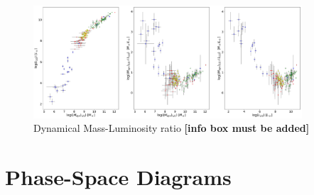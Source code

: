 \documentclass{aa}
\begin{document}
\begin{figure}[!htb]
   \centering
   \includegraphics[angle=90, width=10cm]{../2_pipeline/3_MassDyn_Luminosity+Liter/DyM-L+Liter.pdf}   		
  	 \caption{Dynamical Mass-Luminosity ratio \textbf{[info box must be added]}}
         \label{fig:ML}
\end{figure}


\section{Phase-Space Diagrams}
\end{document}
